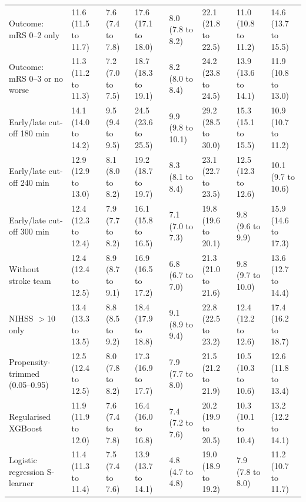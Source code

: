 \begin{landscape}
{\begin{longtable}[]{@{}llllllll@{}}
Outcome: mRS 0--2 only & 11.6 (11.5 to 11.7) & 7.6 (7.4 to 7.8) & 17.6 (17.1 to 18.0) & 8.0 (7.8 to 8.2) & 22.1 (21.8 to 22.5) & 11.0 (10.8 to 11.2) & 14.6 (13.7 to 15.5) \\
Outcome: mRS 0--3 or no worse & 11.3 (11.2 to 11.3) & 7.2 (7.0 to 7.5) & 18.7 (18.3 to 19.1) & 8.2 (8.0 to 8.4) & 24.2 (23.8 to 24.5) & 13.9 (13.6 to 14.1) & 11.9 (10.8 to 13.0) \\
Early/late cut-off 180 min & 14.1 (14.0 to 14.2) & 9.5 (9.4 to 9.5) & 24.5 (23.6 to 25.5) & 9.9 (9.8 to 10.1) & 29.2 (28.5 to 30.0) & 15.3 (15.1 to 15.5) & 10.9 (10.7 to 11.2) \\
Early/late cut-off 240 min & 12.9 (12.9 to 13.0) & 8.1 (8.0 to 8.2) & 19.2 (18.7 to 19.7) & 8.3 (8.1 to 8.4) & 23.1 (22.7 to 23.5) & 12.5 (12.3 to 12.6) & 10.1 (9.7 to 10.6) \\
Early/late cut-off 300 min & 12.4 (12.3 to 12.4) & 7.9 (7.7 to 8.2) & 16.1 (15.8 to 16.5) & 7.1 (7.0 to 7.3) & 19.8 (19.6 to 20.1) & 9.8 (9.6 to 9.9) & 15.9 (14.6 to 17.3) \\
Without stroke team & 12.4 (12.4 to 12.5) & 8.9 (8.7 to 9.1) & 16.9 (16.5 to 17.2) & 6.8 (6.7 to 7.0) & 21.3 (21.0 to 21.6) & 9.8 (9.7 to 10.0) & 13.6 (12.7 to 14.4) \\
NIHSS $>$10 only & 13.4 (13.3 to 13.5) & 8.8 (8.5 to 9.2) & 18.4 (17.9 to 18.8) & 9.1 (8.9 to 9.4) & 22.8 (22.5 to 23.2) & 12.4 (12.2 to 12.6) & 17.4 (16.2 to 18.7) \\
Propensity-trimmed (0.05--0.95) & 12.5 (12.4 to 12.5) & 8.0 (7.8 to 8.2) & 17.3 (16.9 to 17.7) & 7.9 (7.7 to 8.0) & 21.5 (21.2 to 21.9) & 10.5 (10.3 to 10.6) & 12.6 (11.8 to 13.4) \\
Regularised XGBoost & 11.9 (11.9 to 12.0) & 7.6 (7.4 to 7.8) & 16.4 (16.0 to 16.8) & 7.4 (7.2 to 7.6) & 20.2 (19.9 to 20.5) & 10.3 (10.1 to 10.4) & 13.2 (12.2 to 14.1) \\
Logistic regression S-learner & 11.4 (11.3 to 11.4) & 7.5 (7.4 to 7.6) & 13.9 (13.7 to 14.1) & 4.8 (4.7 to 4.8) & 19.0 (18.9 to 19.2) & 7.9 (7.8 to 8.0) & 11.2 (10.7 to 11.7) \\
\end{longtable}

}
\end{landscape}
